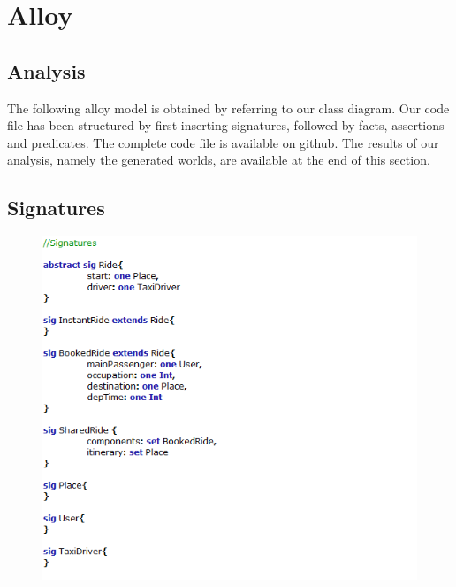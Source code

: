 \section {Alloy}

\subsection{Analysis}
The following alloy model is obtained by referring to our class diagram. Our code file has been structured by first inserting signatures, followed by facts, assertions and predicates.
The complete code file is available on github. The results of our analysis, namely the generated worlds, are available at the end of this section.

\subsection{Signatures}
\begin{figure}[h!]
		\centering
		\includegraphics[height=0.75\textwidth]{"myTaxiServiceImg/Alloy/Signatures"}
\end{figure}

\newpage

